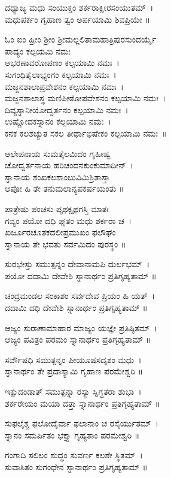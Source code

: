ದಧ್ಯಾಜ್ಯ ಮಧು ಸಂಯುಕ್ತಂ ಶರ್ಕರಾಕ್ಷೀರಸಂಯುತಮ್~।\\ಮಧುಪರ್ಕಂ ಗೃಹಾಣ ತ್ವಂ ಅರ್ಪಯಾಮಿ ಶಿವಪ್ರಿಯೇ ॥

ಓಂ ಐಂ ಹ್ರೀಂ ಶ್ರೀಂ ಶ್ರೀಮಲ್ಲಲಿತಾಮಹಾತ್ರಿಪುರಸುಂದರ್ಯೈ\\ ಪಾದ್ಯಂ ಕಲ್ಪಯಮಿ ನಮಃ\\
ಆಭರಣಾವರೋಪಣಂ ಕಲ್ಪಯಾಮಿ ನಮಃ~।\\
ಸುಗಂಧಿತೈಲಾಭ್ಯಂಗಂ ಕಲ್ಪಯಾಮಿ ನಮಃ~।\\
ಮಜ್ಜನಶಾಲಾಪ್ರವೇಶನಂ ಕಲ್ಪಯಾಮಿ ನಮಃ~।\\
ಮಜ್ಜನಶಾಲಾಸ್ಥ ಮಣಿಪೀಠೋಪವೇಶನಂ ಕಲ್ಪಯಾಮಿ ನಮಃ~।\\
ದಿವ್ಯಸ್ನಾನೀಯೋದ್ವರ್ತನಂ ಕಲ್ಪಯಾಮಿ ನಮಃ~।\\
ಉಷ್ಣೋದಕಸ್ನಾನಂ ಕಲ್ಪಯಾಮಿ ನಮಃ~।\\
ಕನಕ ಕಲಶಚ್ಯುತ ಸಕಲ ತೀರ್ಥಾಭಿಷೇಕಂ ಕಲ್ಪಯಾಮಿ ನಮಃ~॥

ಆಲೇಪನಾಯ ಸುಮತೈಲಮಿದಂ ಗೃಹೀಷ್ವ\\ ಚೋದ್ವರ್ತನಾಯ ಹರಿಚಂದನಕುಂಕುಮಾದೀನ್~।\\
\newpage ಸ್ನಾನಾಯ ಶಂಖಕಲಶಾಂಬುವಿಮಿಶ್ರಿತಾಸ್ತಾ\\ ಆಪೋ ಹಿ ತೇ ತನುಮಲಾನ್ಯಪಕರ್ಷಯಂತು ॥

ಪಾತ್ರೇಷು ಪಂಚಸು ಪೃಥಕ್ಪೃಥಗಸ್ತಿ ಮಾತಃ\\ಗವ್ಯಂ ಪಯೋ ದಧಿ ಘೃತಂ ಮಧು ಶರ್ಕರಾ ಚ~।\\
ಖರ್ಜೂರಚೂತಕದಲೀಪ್ರಮುಖಂ ಫಲೌಘಂ\\ ಸ್ನಾನಾಯ ತೇ ಭವತು ಸರ್ವಮಿದಂ ಪುರಸ್ಥಂ ॥

ಸುರಭೇಸ್ತು ಸಮುತ್ಪನ್ನಂ ದೇವಾನಾಮಪಿ ದುರ್ಲಭಮ್~।\\ಪಯೋ ದದಾಮಿ ದೇವೇಶಿ ಸ್ನಾನಾರ್ಥಂ ಪ್ರತಿಗೃಹ್ಯತಾಮ್ ॥

ಚಂದ್ರಮಂಡಲ ಸಂಕಾಶಂ ಸರ್ವದೇವ ಪ್ರಿಯಂ ಹಿ ಯತ್~।\\ ದದಾಮಿ ದಧಿ ದೇವೇಶಿ ಸ್ನಾನಾರ್ಥಂ ಪ್ರತಿಗೃಹ್ಯತಾಮ್ ॥

ಆಜ್ಯಂ ಸುರಾಣಾಮಾಹಾರ ಮಾಜ್ಯಂ ಯಜ್ಞೇ ಪ್ರತಿಷ್ಠಿತಮ್~। \\ ಆಜ್ಯಂ ಪವಿತ್ರಂ ಪರಮಂ ಸ್ನಾನಾರ್ಥಂ ಪ್ರತಿಗೃಹ್ಯತಾಮ್ ॥

ಸರ್ವೌಷಧಿ ಸಮುತ್ಪನ್ನಂ ಪೀಯೂಷಸದೃಶಂ ಮಧು~।\\ ಸ್ನಾನಾರ್ಥಂ ತೇ ಪ್ರದಾಸ್ಯಾಮಿ ಗೃಹಾಣ ಪರಮೇಶ್ವರಿ ॥

ಇಕ್ಷುದಂಡಾತ್ ಸಮುತ್ಪನ್ನಾ ರಸ್ಯಾ ಸ್ನಿಗ್ಧತರಾ ಶುಭಾ~।\\ಶರ್ಕರೇಯಂ ಮಯಾ ದತ್ತಾ ಸ್ನಾನಾರ್ಥಂ ಪ್ರತಿಗೃಹ್ಯತಾಮ್ ॥

ಸುಫಲೈಶ್ಚ ಫಲೋದೈರ್ವಾ ಫಲಾನಾಂ ಚ ರಸೈರ್ಯುತಮ್~।\\ ಸ್ನಾನಂ ಸಮರ್ಪಿತಂ ಭಕ್ತ್ಯಾ ಗೃಹ್ಯತಾಂ ಪರಮೇಶ್ವರಿ ॥

ಗಂಗಾದಿ ಸಲಿಲಂ ಶುದ್ಧಂ ಸುವರ್ಣ ಕಲಶೇ ಸ್ಥಿತಮ್~।\\ ಸುವಾಸಿತಂ ಸುಗಂಧೇನ ಸ್ನಾನಾರ್ಥಂ ಪ್ರತಿಗೃಹ್ಯತಾಮ್ ॥

